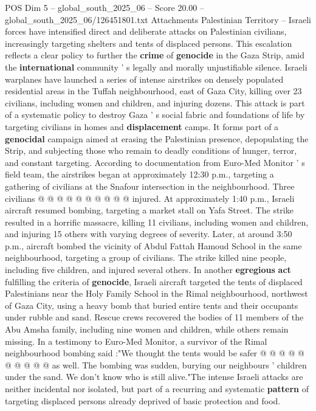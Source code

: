 \begin{textsample}{POS Dim 5 – global\_south\_2025\_06 – Score 20.00 – global\_south\_2025\_06/126451801.txt}  \label{ex:f5_pos_052}
Attachments Palestinian Territory -- Israeli forces have intensified direct and deliberate attacks on Palestinian civilians, increasingly targeting shelters and tents of displaced persons.
This escalation reflects a clear policy to further the \textbf{crime} of \textbf{genocide} in the Gaza Strip, amid the \textbf{international} community ' s legally and morally unjustifiable silence.
Israeli warplanes have launched a series of intense airstrikes on densely populated residential areas in the Tuffah neighbourhood, east of Gaza City, killing over 23 civilians, including women and children, and injuring dozens.
This attack is part of a systematic policy to destroy Gaza ' s social fabric and foundations of life by targeting civilians in homes and \textbf{displacement} camps.
It forms part of a \textbf{genocidal} campaign aimed at erasing the Palestinian presence, depopulating the Strip, and subjecting those who remain to deadly conditions of hunger, terror, and constant targeting.
According to documentation from Euro-Med Monitor ' s field team, the airstrikes began at approximately 12:30 p.m., targeting a gathering of civilians at the Snafour intersection in the neighbourhood.
Three civilians @ @ @ @ @ @ @ @ @ @ injured.
At approximately 1:40 p.m., Israeli aircraft resumed bombing, targeting a market stall on Yafa Street.
The strike resulted in a horrific massacre, killing 11 civilians, including women and children, and injuring 15 others with varying degrees of severity.
Later, at around 3:50 p.m., aircraft bombed the vicinity of Abdul Fattah Hamoud School in the same neighbourhood, targeting a group of civilians.
The strike killed nine people, including five children, and injured several others.
In another \textbf{egregious} \textbf{act} fulfilling the criteria of \textbf{genocide}, Israeli aircraft targeted the tents of displaced Palestinians near the Holy Family School in the Rimal neighbourhood, northwest of Gaza City, using a heavy bomb that buried entire tents and their occupants under rubble and sand.
Rescue crews recovered the bodies of 11 members of the Abu Amsha family, including nine women and children, while others remain missing.
In a testimony to Euro-Med Monitor, a survivor of the Rimal neighbourhood bombing said :"We thought the tents would be safer @ @ @ @ @ @ @ @ @ @ as well.
The bombing was sudden, burying our neighbours ' children under the sand.
We don't know who is still alive."The intense Israeli attacks are neither incidental nor isolated, but part of a recurring and systematic \textbf{pattern} of targeting displaced persons already deprived of basic protection and food.

\end{textsample}
